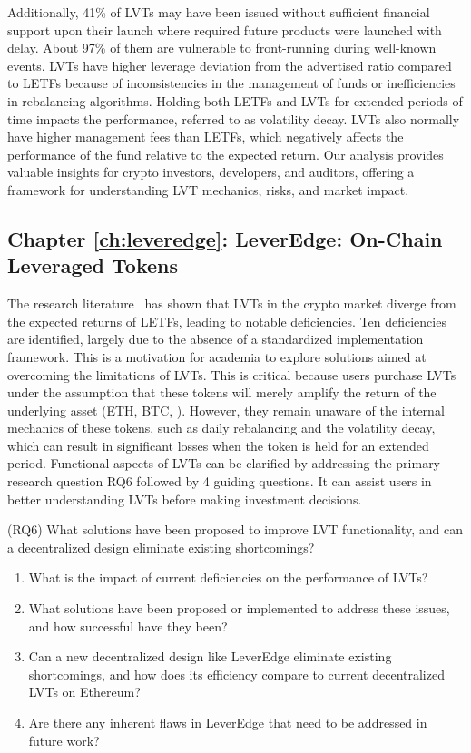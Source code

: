Additionally, 41\% of LVTs may have been issued without sufficient financial support upon their launch where required future products were launched with delay. About 97\% of them are vulnerable to front-running during well-known events. LVTs have higher leverage deviation from the advertised ratio compared to LETFs because of inconsistencies in the management of funds or inefficiencies in rebalancing algorithms. Holding both LETFs and LVTs for extended periods of time impacts the performance, referred to as volatility decay. LVTs also normally have higher management fees than LETFs, which negatively affects the performance of the fund relative to the expected return. Our analysis provides valuable insights for crypto investors, developers, and auditors, offering a framework for understanding LVT mechanics, risks, and market impact.

\subsection{Chapter \ref{ch:leveredge}: LeverEdge: On-Chain Leveraged Tokens} 
The research literature~\cite{shortfall,khomyn2020value,szpruch2024leveraged,Sullivan_2009} has shown that LVTs in the crypto market diverge from the expected returns of LETFs, leading to notable deficiencies. Ten deficiencies are identified, largely due to the absence of a standardized implementation framework. This is a motivation for academia to explore solutions aimed at overcoming the limitations of LVTs. This is critical because users purchase LVTs under the assumption that these tokens will merely amplify the return of the underlying asset (ETH, BTC, \etc). However, they remain unaware of the internal mechanics of these tokens, such as daily rebalancing and the volatility decay, which can result in significant losses when the token is held for an extended period. Functional aspects of LVTs can be clarified by addressing the primary research question RQ6 followed by 4 guiding questions. It can assist users in better understanding LVTs before making investment decisions.

\noindent (RQ6) What solutions have been proposed to improve LVT functionality, and can a decentralized design eliminate existing shortcomings?
\begin{enumerate} [label={(RQ6.\arabic*)},leftmargin=*]
	\item What is the impact of current deficiencies on the performance of LVTs?
	\item What solutions have been proposed or implemented to address these issues, and how successful have they been?
	\item Can a new decentralized design like LeverEdge eliminate existing shortcomings, and how does its efficiency compare to current decentralized LVTs on Ethereum?
	\item Are there any inherent flaws in LeverEdge that need to be addressed in future work?
\end{enumerate}
